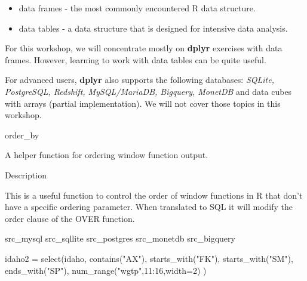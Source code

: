 \documentclass{article}
\begin{document}
	\begin{itemize}
		\item data frames - the  most commonly encountered R data structure. 
		\item data tables - a data structure that is designed for intensive data analysis.
	\end{itemize}
	
	\noindent For this workshop, we will concentrate mostly on \textbf{dplyr} exercises with data frames. However, learning to work with data tables can be quite useful.\\
	\bigskip
	
	\noindent For advanced users, \textbf{dplyr} also supports the following databases: \textit{SQLite, PostgreSQL, Redshift, MySQL/MariaDB, Bigquery, MonetDB} and data cubes with arrays (partial implementation). We will not cover those topics in this workshop.
	




order\_by 

A helper function for ordering window function output.

Description

This is a useful function to control the order of window functions in R that don’t have a specific
ordering parameter. When translated to SQL it will modify the order clause of the OVER function.


src_mysql
src_sqllite
src_postgres
src_monetdb
src_bigquery


idaho2 = select(idaho,
contains("AX"),
starts_with("FK"),
starts_with("SM"),
ends_with("SP"),
num_range("wgtp",11:16,width=2)
)

\end{document}
